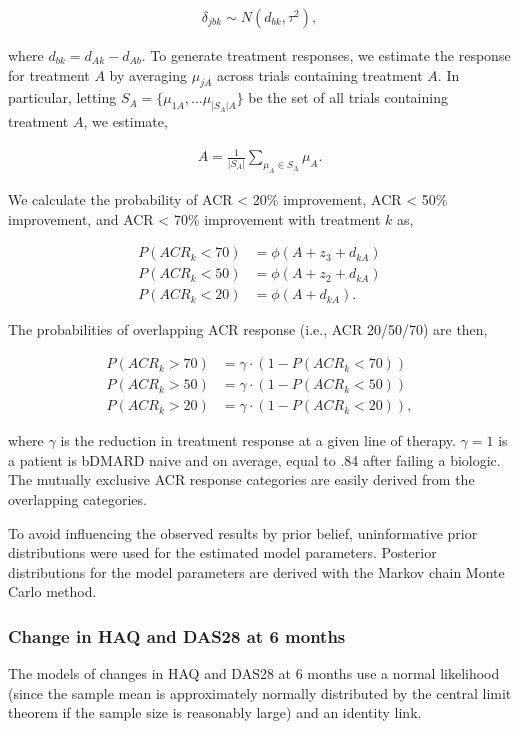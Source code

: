 \documentclass[11pt,final,fleqn]{article}
\theoremstyle{plain}
\begin{document}
\begin{appendices}
\begin{align}
\delta_{jbk} \sim N(d_{bk}, \tau^2),
\end{align}

where $d_{bk} = d_{Ak} - d_{Ab}$. To generate treatment responses, we estimate the response for treatment $A$ by averaging $\mu_{jA}$ across trials containing treatment $A$. In particular, letting $S_A = \{\mu_{1A}, \ldots \mu_{|S_A|A}\}$ be the set of all trials containing treatment $A$, we estimate,

\begin{align} \label{eqn:NMA-A}
A = \frac{1}{|S_A|}\sum_{\mu_{A} \in S_A} \mu_{A}.
\end{align}

We calculate the probability of ACR < 20\% improvement, ACR < 50\% improvement, and ACR < 70\% improvement with treatment $k$ as,

\begin{align}
P(ACR_k < 70) &= \phi(A + z_3 + d_{kA}) \\
P(ACR_k < 50) &= \phi(A + z_2 + d_{kA}) \\
P(ACR_k < 20) &= \phi(A + d_{kA}).
\end{align}

The probabilities of overlapping ACR response (i.e., ACR 20/50/70) are then,

\begin{align} \label{eqn:ACR-overlap}
P(ACR_k > 70) &= \gamma \cdot (1 - P(ACR_k < 70))\\
P(ACR_k > 50) &= \gamma \cdot  (1 - P(ACR_k < 50)) \\
P(ACR_k > 20) &= \gamma \cdot (1 - P(ACR_k < 20)),
\end{align}

where $\gamma$ is the reduction in treatment response at a given line of therapy. $\gamma = 1$ is a patient is bDMARD naive and on average, equal to .84 after failing a biologic. The mutually exclusive ACR response categories are easily derived from the overlapping categories. 

To avoid influencing the observed results by prior belief, uninformative prior distributions were used for the estimated model parameters. Posterior distributions for the model parameters are derived with the Markov chain Monte Carlo method.

\subsubsection{Change in HAQ and DAS28 at 6 months}
The models of changes in HAQ and DAS28 at 6 months use a normal likelihood (since the sample mean is approximately normally distributed by the central limit theorem if the sample size is reasonably large) and an identity link. 


\end{appendices}
\end{document}
